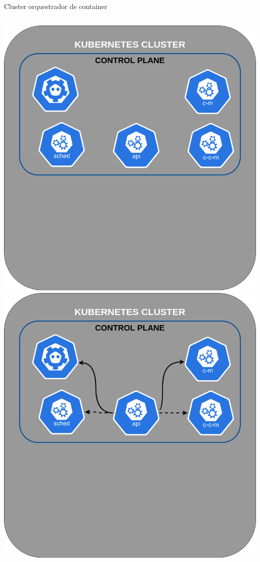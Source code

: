 \documentclass[10pt,brazil]{beamer}
\theoremstyle{definition}
\begin{document}
\begin{frame}{Cluster orquestrador de container}
\begin{columns}
\begin{column}{0.5\textwidth}
\begin{center}
\begin{overprint}
          \includegraphics[width=1\textwidth]{k8s-6.png}
          \includegraphics[width=1\textwidth]{k8s-7.png}

\end{overprint}
\end{center}
\end{column}
\end{columns}
\end{frame}
\end{document}
